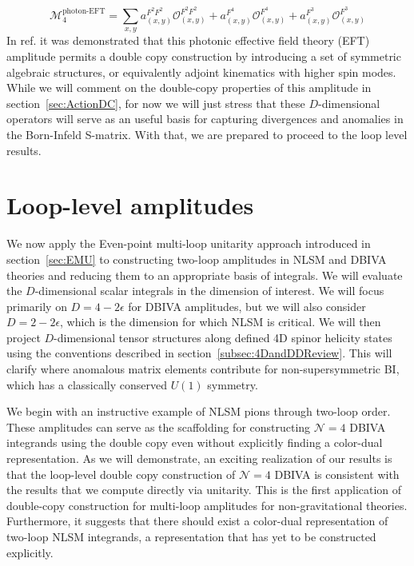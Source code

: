 \documentclass[12pt,letter]{article}
\def\sect#1{section~\ref{#1}}
\begin{document}
\begin{equation}
\boxed{\mathcal{M}^{\text{photon-EFT}}_4 = \sum_{x,y} a_{(x,y)}^{F^2F^2}\mathcal{O}^{F^2F^2}_{(x,y)}+a_{(x,y)}^{F^4}\mathcal{O}^{F^4}_{(x,y)}+a_{(x,y)}^{F^3}\mathcal{O}^{F^3}_{(x,y)}}
\end{equation}
In ref. \cite{Carrasco:2022jxn} it was demonstrated that this photonic effective field theory (EFT) amplitude permits a double copy construction by introducing a set of symmetric algebraic structures, or equivalently adjoint kinematics with higher spin modes. While we will comment on the double-copy properties of this amplitude in \sect{sec:ActionDC}, for now we will just stress that these $D$-dimensional operators will serve as an useful basis for capturing divergences and anomalies in the Born-Infeld S-matrix. With that, we are prepared to proceed to the loop level results. 

\section{Loop-level amplitudes}\label{sec:Loops}
We now apply the Even-point multi-loop unitarity approach introduced in \sect{sec:EMU} to constructing two-loop amplitudes in NLSM and DBIVA theories and reducing them to an appropriate basis of integrals. We will evaluate the $D$-dimensional scalar integrals in the dimension of interest. We will focus primarily on $D=4-2\epsilon$ for DBIVA amplitudes, but we will also consider $D=2-2\epsilon$, which is the dimension for which NLSM is critical.   We will then project $D$-dimensional tensor structures along defined 4D spinor helicity states using the conventions described in \sect{subsec:4DandDDReview}. This will clarify where anomalous matrix elements contribute for non-supersymmetric BI, which has a classically conserved $U(1)$ symmetry. 


We begin with an instructive example of NLSM pions through two-loop order. These amplitudes can serve as the scaffolding for constructing $\mathcal{N}=4$ DBIVA integrands using the double copy even without explicitly finding a color-dual representation. As we will demonstrate, an exciting realization of our results is that the loop-level double copy construction of $\mathcal{N}=4$ DBIVA is consistent with the results that we compute directly via unitarity. This is the first application of double-copy construction for multi-loop amplitudes for non-gravitational theories. Furthermore, it suggests that there should exist a color-dual representation of two-loop NLSM integrands, a representation that has yet to be constructed explicitly. 
\end{document}

